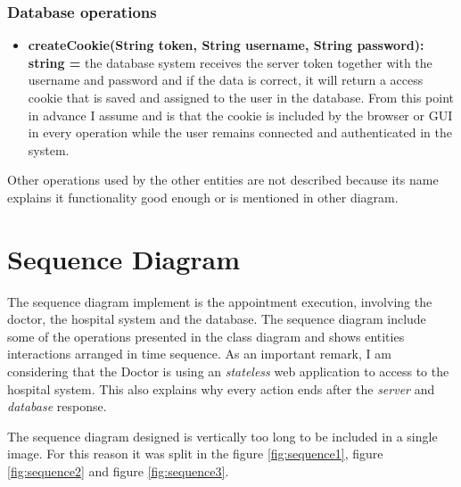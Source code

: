 \documentclass{article}
\begin{document}
            \subsubsection{Database operations}
            \begin{itemize}

                \item \textbf{createCookie(String token, String username, String password): string = } the database system receives the server token together with the username and password and if the data is correct, it will return a access cookie that is saved and assigned to the user in the database.
                From this point in advance I assume and is that the cookie is included by the browser or GUI in every operation while the user remains connected and authenticated in the system.
            \end{itemize}

            Other operations used by the other entities are not described because its name explains it functionality good enough or is mentioned in other diagram.

            
            \section{Sequence Diagram}
            The sequence diagram implement is the appointment execution, involving the doctor, the hospital system and the database. The sequence diagram include some of the operations presented in the class diagram and shows entities interactions arranged in time sequence. As an important remark, I am considering that the
            Doctor is using an \textit{stateless} web application to access to the hospital system. This also explains why every action ends after the \textit{server} and \textit{database} response.

            The sequence diagram designed is vertically too long to be included in a single image. For this reason it was split in the figure \ref{fig:sequence1}, figure \ref{fig:sequence2} and figure \ref{fig:sequence3}.
           
\end{document}
